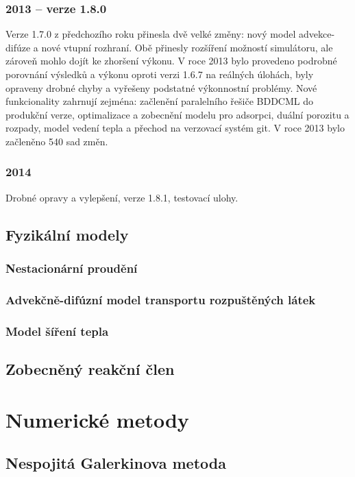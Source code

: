 \documentclass[11pt]{report}
\begin{document}
\subsubsection{2013 -- verze 1.8.0}
Verze 1.7.0 z předchozího roku přinesla dvě velké změny: nový model 
advekce-difúze a nové vtupní rozhraní. Obě přinesly rozšíření možností 
simulátoru, ale zároveň mohlo dojít ke zhoršení výkonu. V roce 2013 bylo 
provedeno podrobné porovnání výsledků a výkonu oproti verzi 1.6.7 na reálných 
úlohách, byly opraveny drobné chyby a vyřešeny podstatné výkonnostní problémy.  
Nové funkcionality zahrnují zejména: začlenění paralelního řešiče BDDCML do 
produkční verze, optimalizace a zobecnění modelu pro adsorpci, duální porozitu a 
rozpady, model vedení tepla a přechod na verzovací systém git. V roce 2013 bylo 
začleněno 540 sad změn.
\subsubsection{2014}
Drobné opravy a vylepšení, verze 1.8.1, testovací ulohy.

\subsection{Fyzikální modely}
\subsubsection{Nestacionární proudění}

\subsubsection{Advekčně-difúzní model transportu rozpuštěných látek}
\label{sc:transport_model}


\subsubsection{Model šíření tepla}
\label{sc:heat}


\subsection{Zobecněný reakční člen}

\section{Numerické metody}
\subsection{Nespojitá Galerkinova metoda}

\end{document}
